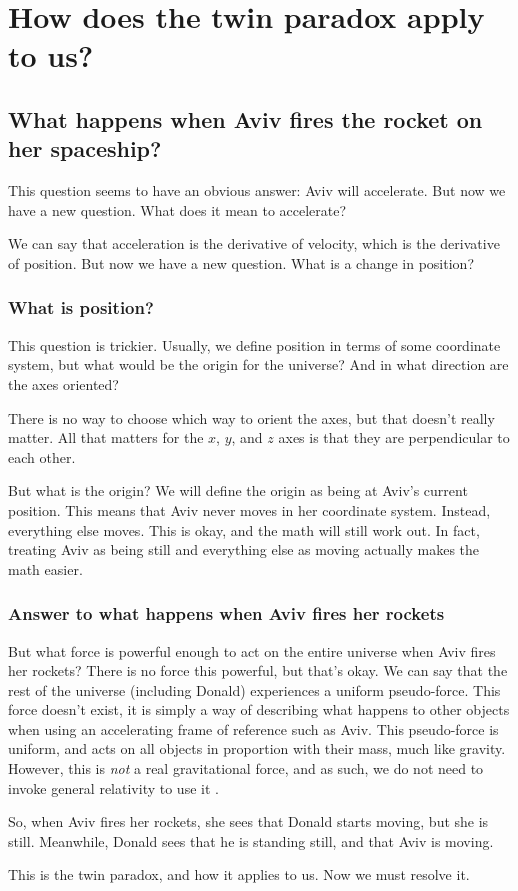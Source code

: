 	\section{How does the twin paradox apply to us?}
		\subsection{What happens when Aviv fires the rocket on her spaceship?}
			This question seems to have an obvious answer: Aviv will accelerate.
			But now we have a new question.
			What does it mean to accelerate?

			We can say that acceleration is the derivative of velocity, which is the derivative of position.
			But now we have a new question.
			What is a change in position?
			\subsubsection{What is position?}
				This question is trickier.
				Usually, we define position in terms of some coordinate system, but what would be the origin for the universe?
				And in what direction are the axes oriented?

				There is no way to choose which way to orient the axes, but that doesn't really matter.
				All that matters for the $x$, $y$, and $z$ axes is that they are perpendicular to each other.

				But what is the origin?
				We will define the origin as being at Aviv's current position.
				This means that Aviv never moves in her coordinate system.
				Instead, everything else moves.
				This is okay, and the math will still work out.
				In fact, treating Aviv as being still and everything else as moving actually makes the math easier.

			\subsubsection{Answer to what happens when Aviv fires her rockets}
				But what force is powerful enough to act on the entire universe when Aviv fires her rockets?
				There is no force this powerful, but that's okay.
				We can say that the rest of the universe (including Donald) experiences a uniform pseudo-force.
				This force doesn't exist, it is simply a way of describing what happens to other objects when using an accelerating frame of reference such as Aviv.
				This pseudo-force is uniform, and acts on all objects in proportion with their mass, much like gravity.
				However, this is \emph{not} a real gravitational force, and as such, we do not need to invoke general relativity to use it \autocite{twinparadox}.

				So, when Aviv fires her rockets, she sees that Donald starts moving, but she is still.
				Meanwhile, Donald sees that he is standing still, and that Aviv is moving.

				This is the twin paradox, and how it applies to us. Now we must resolve it.
